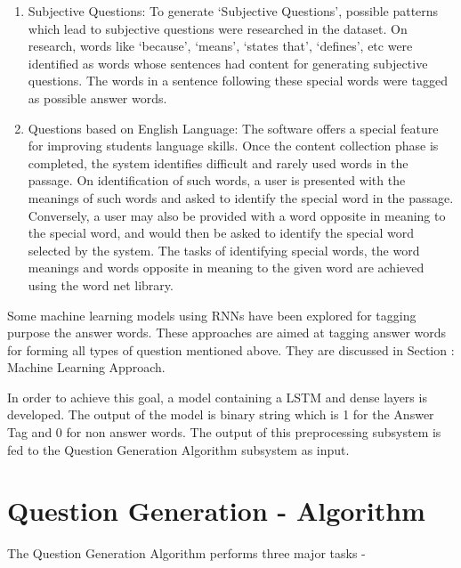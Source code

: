 \begin{enumerate}
\begin{enumerate}
	\item Subjective Questions: To generate ‘Subjective Questions’,
	possible patterns which lead to subjective questions were
	researched in the dataset. On research, words like ‘because’,
	‘means’, ‘states that’, ‘defines’, etc were identified as words
	whose sentences had content for generating subjective questions.
	The words in a sentence following these special words were
	tagged as possible answer words.

	\item Questions based on English Language: The software offers a
	special feature for improving students language skills. Once the
	content collection phase is completed, the system identifies
	difficult and rarely used words in the passage. On
	identification of such words, a user is presented with the
	meanings of such words and asked to identify the special word in
	the passage. Conversely, a user may also be provided with a word
	opposite in meaning to the special word, and would then be asked
	to identify the special word selected by the system. The tasks
	of identifying special words, the word meanings and words
	opposite in meaning to the given word are achieved using the
	word net library.

	\end{enumerate}

	Some machine learning models using RNNs have been explored for
	tagging purpose the answer words. These approaches are aimed at
	tagging answer words for forming all types of question mentioned
	above. They are discussed in Section : Machine Learning
	Approach.

\end{enumerate}

In order to achieve this goal, a model containing a LSTM and dense layers is
developed. The output of the model is binary string which is 1 for the Answer Tag
and 0 for non answer words. The output of this preprocessing subsystem is fed to the Question Generation Algorithm subsystem as input. 

\section{Question Generation - Algorithm}

The Question Generation Algorithm performs three major tasks - 

